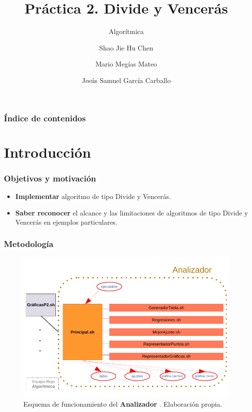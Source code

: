 \documentclass[13pt]{beamer}
\author{Shao Jie Hu Chen \and Mario Megías Mateo \and Jesús Samuel García Carballo}
\title{Práctica 2. Divide y Vencerás}
\subtitle{Algorítmica}
\institute{Equipo Rojo}
\begin{document}
	
	\begin{frame}[plain]
		\maketitle
	\end{frame}
	
	\begin{frame}
		\frametitle{Índice de contenidos}
		\tableofcontents
	\end{frame}


    \section{Introducción}

    \begin{frame}
        \frametitle{Objetivos y motivación}

        \begin{itemize}
            \item \textbf{Implementar} algoritmo de tipo Divide y Vencerás.
            \item \textbf{Saber reconocer} el alcance y las limitaciones de algoritmos 
            de tipo Divide y Vencerás en ejemplos particulares.
        \end{itemize}

    \end{frame}

    \begin{frame}
        \frametitle{Metodología}

        \begin{figure}[h]
            \centering
            \includegraphics[scale=0.65]{img/esquema_graphkiller.pdf}
            \caption{Esquema de funcionamiento del \textbf{Analizador} \cite{Rojo2022}. Elaboración propia.}
            \label{fig:analizador}
        \end{figure}
    \end{frame}
\end{document}
